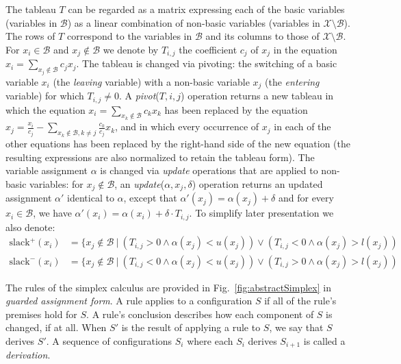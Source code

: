 \documentclass[a4paper]{llncs}
\newcommand{\basic}{\mathcal{B}}
\newcommand{\allvars}{\mathcal{X}}
\newcommand{\ub}{u}
\newcommand{\lb}{l}
\newcommand{\assignment}{\alpha{}}
\newcommand{\slack}{\text{slack}\xspace{}}
\newcommand{\pivotOperation}{\textit{pivot}}
\newcommand{\updateOperation}{\textit{update}}
\begin{document}
The tableau $T$ can be regarded as a matrix expressing
each of the basic variables (variables in $\basic{}$) as a linear combination of non-basic
variables (variables in $\allvars{}\setminus\basic{}$). The rows of
$T$ correspond to the variables in $\basic{}$ and its columns to
those of $\allvars{}\setminus\basic{}$. For $x_i\in\basic{}$ and
$x_j\notin\basic{}$ we denote by $T_{i,j}$ the coefficient
$c_j$ of $x_j$ in the equation $x_i=\sum_{x_j\notin\basic} c_j x_j$.
The tableau is changed via pivoting: the switching of a basic variable
$x_i$ (the \emph{leaving} variable) with a non-basic variable $x_j$
(the \emph{entering} variable) for which $T_{i,j}\neq 0$. A
\pivotOperation{}($T,i,j$) operation returns a new tableau in which the equation $x_i=\sum_{x_k\notin\basic}
c_k x_k$ has been replaced by the equation
$
x_j = \frac{x_i}{c_j} - \sum_{x_k\notin\basic, k\neq j}\frac{c_k}{c_j}x_k
$, and in which every occurrence of $x_j$ in each of the other equations has been
replaced by the right-hand side of the new equation (the resulting expressions
are also normalized to retain the tableau form).
The variable assignment $\assignment{}$ is changed via \emph{update} operations that are
applied to non-basic variables:
for $x_j\notin\basic{}$, an \updateOperation{}($\assignment, x_j,\delta$) operation
returns
an updated
assignment $\assignment'$ identical to $\assignment$, except that
$\assignment'(x_j)=\assignment(x_j)+\delta$ and for
every $x_i\in \basic$, we have
$
\assignment'(x_i)=\assignment(x_i)+\delta\cdot T_{i,j}.
$
To simplify later presentation we also denote:
\begin{align*}
\slack^+(x_i) 
&=
\{
x_j\notin\basic{}\ |\ 
(T_{i,j}>0
\wedge
\assignment(x_j) < \ub(x_j))
\vee
(T_{i,j}<0
\wedge
\assignment(x_j) > \lb(x_j))
\\
\slack^-(x_i) 
&=
\{
x_j\notin\basic{}\ |\ 
(T_{i,j}<0
\wedge
\assignment(x_j) < \ub(x_j))
\vee
(T_{i,j}>0
\wedge
\assignment(x_j) > \lb(x_j))
\end{align*}

The rules of the simplex calculus are provided in
Fig.~\ref{fig:abstractSimplex} in \emph{guarded assignment form}.  A rule
applies to a configuration $S$ if all of the rule's premises hold for $S$.  A
rule's conclusion describes how each component of $S$ is changed, if at all.
When $S'$ is the result of applying a rule to $S$, we say that $S$ derives $S'$.  A sequence of configurations $S_i$
where each $S_i$ derives $S_{i+1}$ is called a \emph{derivation}.
\end{document}
